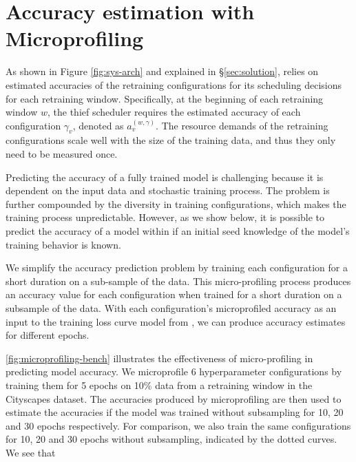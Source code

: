 \section{Accuracy estimation with Microprofiling}
\label{sec:profiling}











As shown in Figure \ref{fig:sys-arch} and explained in \S\ref{sec:solution}, {\name} relies on estimated accuracies of the retraining configurations for its scheduling decisions for each retraining window. Specifically, at the beginning of each retraining window $w$, the thief scheduler requires the estimated accuracy of each configuration $\gamma_v$, denoted as $a_v^{(w,\gamma)}$. The resource demands of the retraining configurations scale well with the size of the training data, and thus they only need to be measured once.

Predicting the accuracy of a fully trained model is challenging because it is dependent on the input data and stochastic training process. The problem is further compounded by the diversity in training configurations, which makes the training process unpredictable. However, as we show below, it is possible to predict the accuracy of a model within  if an initial seed knowledge of the model's training behavior is known. 

We simplify the accuracy prediction problem by training each configuration for a short duration on a sub-sample of the data. This micro-profiling process produces an accuracy value for each configuration when trained for a short duration on a subsample of the data. With each configuration's microprofiled accuracy as an input to the training loss curve model from \cite{optimus}, we can produce accuracy estimates for different epochs.

\cref{fig:microprofiling-bench} illustrates the effectiveness of micro-profiling in predicting model accuracy. We microprofile 6 hyperparameter configurations by training them for 5 epochs on 10\% data from a retraining window in the Cityscapes dataset. The accuracies produced by microprofiling are then used to estimate the accuracies if the model was trained without subsampling for 10, 20 and 30 epochs respectively. For comparison, we also train the same configurations for 10, 20 and 30 epochs without subsampling, indicated by the dotted curves. We see that 

